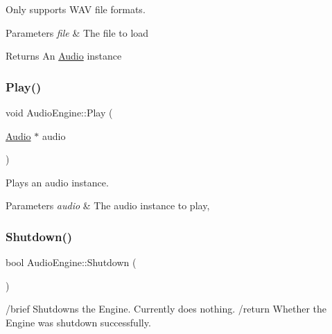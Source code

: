 Only supports W\+AV file formats. 
\begin{DoxyParams}{Parameters}
{\em file} & The file to load \\
\hline
\end{DoxyParams}
\begin{DoxyReturn}{Returns}
An \hyperlink{class_audio}{Audio} instance 
\end{DoxyReturn}
\mbox{\label{class_audio_engine_af4471a467aa56bcad3db5a8a9ce8d733}} 
\subsubsection{\texorpdfstring{Play()}{Play()}}
{\footnotesize\ttfamily void Audio\+Engine\+::\+Play (\begin{DoxyParamCaption}\item[{\hyperlink{class_audio}{Audio} $\ast$}]{audio }\end{DoxyParamCaption})\hspace{0.3cm}{\ttfamily [static]}}



Plays an audio instance. 


\begin{DoxyParams}{Parameters}
{\em audio} & The audio instance to play, \\
\hline
\end{DoxyParams}
\mbox{\label{class_audio_engine_a745076bf5346972aecaf54ced0f5dfc6}} 
\subsubsection{\texorpdfstring{Shutdown()}{Shutdown()}}
{\footnotesize\ttfamily bool Audio\+Engine\+::\+Shutdown (\begin{DoxyParamCaption}{ }\end{DoxyParamCaption})\hspace{0.3cm}{\ttfamily [static]}}

/brief Shutdowns the Engine. Currently does nothing. /return Whether the Engine was shutdown successfully. \mbox{\label{class_audio_engine_abc49a7e983821493bf5becc5ab25c6a0}} 
